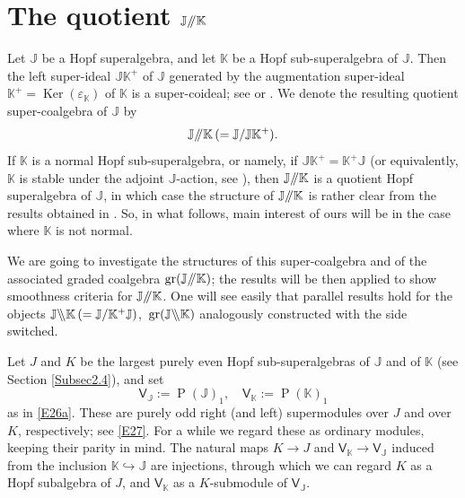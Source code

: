 \documentclass[11pt, a4paper]{amsart}
\theoremstyle{definition}
\numberwithin{equation}{section}
\begin{document}
\section{The quotient $\mathbb{J}/\hspace{-1mm}/\mathbb{K}$}\label{Sec4}

Let $\mathbb{J}$ be a Hopf superalgebra, and let 
$\mathbb{K}$ be a Hopf sub-superalgebra of $\mathbb{J}$.
Then the left super-ideal $\mathbb{J}\mathbb{K}^+$ of $\mathbb{J}$ generated by the augmentation super-ideal
$\mathbb{K}^+=\operatorname{Ker}(\varepsilon_{\mathbb{K}})$ of $\mathbb{K}$ is a super-coideal; see \cite[Proposition 1]{T} or \cite[p.286]{M2}.
We denote the resulting quotient super-coalgebra of $\mathbb{J}$ by 
\begin{equation}\label{E40a}
\mathbb{J}/\hspace{-1mm}/\mathbb{K}\, (=\mathbb{J}/\mathbb{J}\mathbb{K}^+).
\end{equation}
If $\mathbb{K}$ is a normal Hopf sub-superalgebra, or namely, if $\mathbb{J}\mathbb{K}^+=\mathbb{K}^+\mathbb{J}$
(or equivalently, $\mathbb{K}$ is stable under the adjoint $\mathbb{J}$-action, see \cite[Theorem 3.10 (3)]{M2}), then $\mathbb{J}/\hspace{-1mm}/\mathbb{K}$ is a quotient Hopf
superalgebra of $\mathbb{J}$, in which case the structure of $\mathbb{J}/\hspace{-1mm}/\mathbb{K}$ is rather clear
from the results obtained in \cite[Sect. 3]{M3}. So, in what follows, main interest of ours will be in the case
where $\mathbb{K}$ is not normal. 

We are going to investigate the structures of this super-coalgebra 
and of the associated graded coalgebra $\operatorname{gr}(\mathbb{J}/\hspace{-1mm}/\mathbb{K})$;
the results will be then applied to show smoothness criteria for $\mathbb{J}/\hspace{-1mm}/\mathbb{K}$. 
One will see easily that parallel results hold for the objects 
$\mathbb{J}\backslash\hspace{-1mm}\backslash\mathbb{K}\, (=\mathbb{J}/\mathbb{K}^+\mathbb{J})$,\
$\operatorname{gr}(\mathbb{J}\backslash\hspace{-1mm}\backslash\mathbb{K})$ analogously constructed
with the side switched. 

Let $J$ and $K$ be the largest purely even Hopf sub-superalgebras of $\mathbb{J}$ and of $\mathbb{K}$
(see Section \ref{Subsec2.4}), and set
\[ \mathsf{V}_{\mathbb{J}} :=\operatorname{P}(\mathbb{J})_{1}, \quad \mathsf{V}_{\mathbb{K}}:=\operatorname{P}(\mathbb{K})_{1} \]
as in \eqref{E26a}.
These are purely odd right (and left) supermodules over $J$ and over $K$, respectively; see \eqref{E27}. 
For a while we regard these as ordinary modules, keeping their parity in mind.
The natural maps $K \to J$ and $\mathsf{V}_{\mathbb{K}} \to \mathsf{V}_{\mathbb{J}}$ induced from the inclusion $\mathbb{K} \hookrightarrow \mathbb{J}$ are injections, 
through which we can regard $K$ as a Hopf subalgebra of $J$, and $\mathsf{V}_{\mathbb{K}}$ as a $K$-submodule of $\mathsf{V}_{\mathbb{J}}$.
\end{document}
